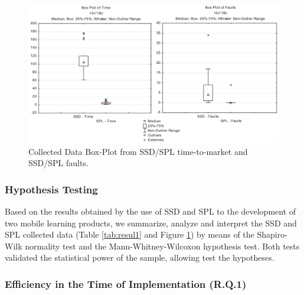 \begin{figure}[!ht]
\centering
\includegraphics[width=1.0\textwidth]{MSPLBoxplotN.png}
\centering
\caption{Collected Data Box-Plot from SSD/SPL time-to-market and SSD/SPL faults.}
\label{fig:boxplot}
\end{figure}

\subsubsection{Hypothesis Testing}

Based on the results obtained by the use of SSD and SPL to the development of two mobile learning products, we summarize, analyze and interpret the SSD and SPL collected data (Table \ref{tab:resul1} and Figure \ref{fig:boxplot}) by means of the Shapiro-Wilk normality test and the Mann-Whitney-Wilcoxon hypothesis test. Both tests validated the statistical power of the sample, allowing test the hypotheses.

\subsubsection{Efficiency in the Time of Implementation (R.Q.1)}

